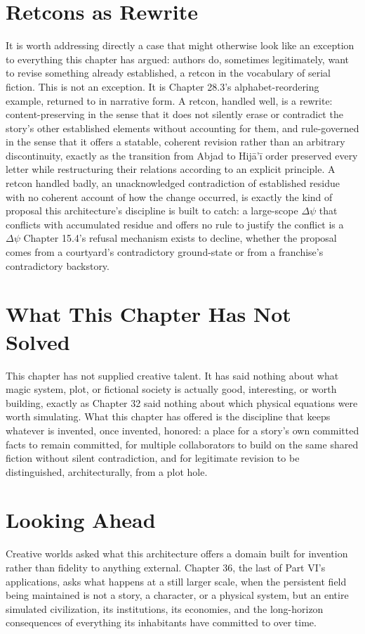 \section{Retcons as Rewrite}

It is worth addressing directly a case that might otherwise look like an exception to everything this chapter has argued: authors do, sometimes legitimately, want to revise something already established, a retcon in the vocabulary of serial fiction. This is not an exception. It is Chapter 28.3's alphabet-reordering example, returned to in narrative form. A retcon, handled well, is a rewrite: content-preserving in the sense that it does not silently erase or contradict the story's other established elements without accounting for them, and rule-governed in the sense that it offers a statable, coherent revision rather than an arbitrary discontinuity, exactly as the transition from Abjad to Hijā'ī order preserved every letter while restructuring their relations according to an explicit principle. A retcon handled badly, an unacknowledged contradiction of established residue with no coherent account of how the change occurred, is exactly the kind of proposal this architecture's discipline is built to catch: a large-scope \(\Delta\psi\) that conflicts with accumulated residue and offers no rule to justify the conflict is a \(\Delta\psi\) Chapter 15.4's refusal mechanism exists to decline, whether the proposal comes from a courtyard's contradictory ground-state or from a franchise's contradictory backstory.

\section{What This Chapter Has Not Solved}

This chapter has not supplied creative talent. It has said nothing about what magic system, plot, or fictional society is actually good, interesting, or worth building, exactly as Chapter 32 said nothing about which physical equations were worth simulating. What this chapter has offered is the discipline that keeps whatever is invented, once invented, honored: a place for a story's own committed facts to remain committed, for multiple collaborators to build on the same shared fiction without silent contradiction, and for legitimate revision to be distinguished, architecturally, from a plot hole.

\section{Looking Ahead}

Creative worlds asked what this architecture offers a domain built for invention rather than fidelity to anything external. Chapter 36, the last of Part VI's applications, asks what happens at a still larger scale, when the persistent field being maintained is not a story, a character, or a physical system, but an entire simulated civilization, its institutions, its economies, and the long-horizon consequences of everything its inhabitants have committed to over time.

